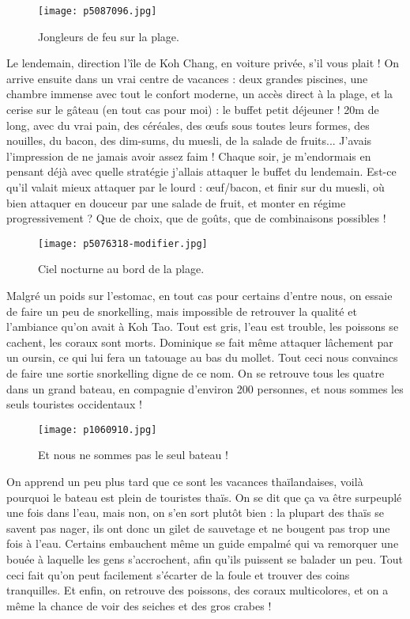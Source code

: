 \documentclass{book}
\begin{document}
\begin{figure}[h]
\centering
\texttt{[image: p5087096.jpg]}
\caption*{Jongleurs de feu sur la plage.}
\end{figure}

Le lendemain, direction l'île de Koh Chang, en voiture privée, s'il vous plait ! On arrive ensuite dans un vrai centre de vacances : deux grandes piscines, une chambre immense avec tout le confort moderne, un accès direct à la plage, et la cerise sur le gâteau (en tout cas pour moi) : le buffet petit déjeuner ! 20m de long, avec du vrai pain, des céréales, des œufs sous toutes leurs formes, des nouilles, du bacon, des dim-sums, du muesli, de la salade de fruits... J'avais l'impression de ne jamais avoir assez faim ! Chaque soir, je m'endormais en pensant déjà avec quelle stratégie j'allais attaquer le buffet du lendemain. Est-ce qu'il valait mieux attaquer par le lourd : œuf/bacon, et finir sur du muesli, où bien attaquer en douceur par une salade de fruit, et monter en régime progressivement ? Que de choix, que de goûts, que de combinaisons possibles !


\begin{figure}[h]
\centering
\texttt{[image: p5076318-modifier.jpg]}
\caption*{Ciel nocturne au bord de la plage.}
\end{figure}

Malgré un poids sur l'estomac, en tout cas pour certains d'entre nous, on essaie de faire un peu de snorkelling, mais impossible de retrouver la qualité et l'ambiance qu'on avait à Koh Tao. Tout est gris, l'eau est trouble, les poissons se cachent, les coraux sont morts. Dominique se fait même attaquer lâchement par un oursin, ce qui lui fera un tatouage au bas du mollet. Tout ceci nous convaincs de faire une sortie snorkelling digne de ce nom. On se retrouve tous les quatre dans un grand bateau, en compagnie d'environ 200 personnes, et nous sommes les seuls touristes occidentaux !


\begin{figure}[h]
\centering
\texttt{[image: p1060910.jpg]}
\caption*{Et nous ne sommes pas le seul bateau !}
\end{figure}

On apprend un peu plus tard que ce sont les vacances thaïlandaises, voilà pourquoi le bateau est plein de touristes thaïs. On se dit que ça va être surpeuplé une fois dans l'eau, mais non, on s'en sort plutôt bien : la plupart des thaïs se savent pas nager, ils ont donc un gilet de sauvetage et ne bougent pas trop une fois à l'eau. Certains embauchent même un guide empalmé qui va remorquer une bouée à laquelle les gens s'accrochent, afin qu'ils puissent se balader un peu. Tout ceci fait qu'on peut facilement s'écarter de la foule et trouver des coins tranquilles. Et enfin, on retrouve des poissons, des coraux multicolores, et on a même la chance de voir des seiches et des gros crabes !
\end{document}

